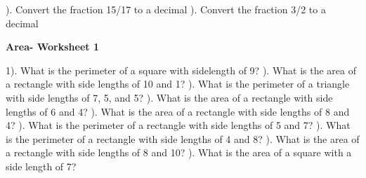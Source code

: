 \documentclass{article}%
\begin{document}
). Convert the fraction 15/17 to a decimal%
\newline%
\newline%
). Convert the fraction 3/2 to a decimal%
\newline%
\newline%
\newline%
\pagebreak%
\large%
\begin{center}%
\textbf{Area- Worksheet 1}%
\newline%
\end{center} \normalsize%
1). What is the perimeter of a square with sidelength of 9?%
\newline%
\newline%
). What is the area of a rectangle with side lengths of 10 and 1?%
\newline%
\newline%
). What is the perimeter of a triangle with side lengths of 7, 5, and 5?%
\newline%
\newline%
). What is the area of a rectangle with side lengths of 6 and 4?%
\newline%
\newline%
). What is the area of a rectangle with side lengths of 8 and 4?%
\newline%
\newline%
). What is the perimeter of a rectangle with side lengths of 5 and 7?%
\newline%
\newline%
). What is the perimeter of a rectangle with side lengths of 4 and 8?%
\newline%
\newline%
). What is the area of a rectangle with side lengths of 8 and 10?%
\newline%
\newline%
). What is the area of a square with a side length of 7?%
\newline%
\newline%
\newline%
\end{document}
